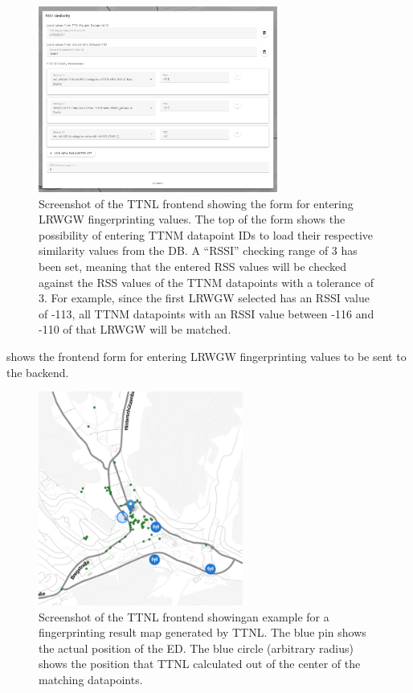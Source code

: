 \begin{figure}[htbp]
    \centering
    \includegraphics[width=0.7\textwidth]{pictures/ttn-locator/frontend/rssi_similarity_form.png}
    \caption{
        Screenshot of the \ac{TTNL} frontend showing the form for entering \acl{LRWGW} fingerprinting values.
        The top of the form shows the possibility of entering \ac{TTNM} datapoint IDs to load their respective similarity values from the \ac{DB}.
        A ``RSSI'' checking range of 3 has been set, meaning that the entered \ac{RSS} values will be checked against the \ac{RSS} values of the \ac{TTNM} datapoints with a tolerance of 3.
        For example, since the first \acl{LRWGW} selected has an \ac{RSSI} value of -113, all \ac{TTNM} datapoints with an \ac{RSSI} value between -116 and -110 of that \acl{LRWGW} will be matched.
    }\label{fig:rssi-similarity-form-frontend}
\end{figure}

 shows the frontend form for entering \acl{LRWGW} fingerprinting values to be sent to the backend.

\begin{figure}[htbp]
    \centering
    \includegraphics[width=0.6\textwidth]{pictures/ttn-locator/frontend/fingerprinting/rssi_similarity_map_example.png}
    \caption{
        Screenshot of the \ac{TTNL} frontend showingan example for a fingerprinting result map generated by \ac{TTNL}.
        The blue pin shows the actual position of the \acl{ED}.
        The blue circle (arbitrary radius) shows the position that \ac{TTNL} calculated out of the center of the matching datapoints.
    }\label{fig:fingerprinting-map-example-only-center}
\end{figure}

